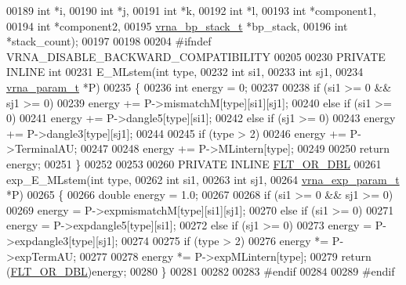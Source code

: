 \begin{DoxyCode}
00189                       \textcolor{keywordtype}{int}                   *i,
00190                       \textcolor{keywordtype}{int}                   *j,
00191                       \textcolor{keywordtype}{int}                   *k,
00192                       \textcolor{keywordtype}{int}                   *l,
00193                       \textcolor{keywordtype}{int}                   *component1,
00194                       \textcolor{keywordtype}{int}                   *component2,
00195                       \hyperlink{group__data__structures_structvrna__bp__stack__s}{vrna\_bp\_stack\_t}       *bp\_stack,
00196                       \textcolor{keywordtype}{int}                   *stack\_count);
00197 
00198 
00204 \textcolor{preprocessor}{#ifndef VRNA\_DISABLE\_BACKWARD\_COMPATIBILITY}
00205 
00230 PRIVATE INLINE \textcolor{keywordtype}{int}
00231 E\_MLstem(\textcolor{keywordtype}{int}          type,
00232          \textcolor{keywordtype}{int}          si1,
00233          \textcolor{keywordtype}{int}          sj1,
00234          \hyperlink{group__energy__parameters_structvrna__param__s}{vrna\_param\_t} *P)
00235 \{
00236   \textcolor{keywordtype}{int} energy = 0;
00237 
00238   \textcolor{keywordflow}{if} (si1 >= 0 && sj1 >= 0)
00239     energy += P->mismatchM[type][si1][sj1];
00240   \textcolor{keywordflow}{else} \textcolor{keywordflow}{if} (si1 >= 0)
00241     energy += P->dangle5[type][si1];
00242   \textcolor{keywordflow}{else} \textcolor{keywordflow}{if} (sj1 >= 0)
00243     energy += P->dangle3[type][sj1];
00244 
00245   \textcolor{keywordflow}{if} (type > 2)
00246     energy += P->TerminalAU;
00247 
00248   energy += P->MLintern[type];
00249 
00250   \textcolor{keywordflow}{return} energy;
00251 \}
00252 
00253 
00260 PRIVATE INLINE \hyperlink{group__data__structures_ga31125aeace516926bf7f251f759b6126}{FLT\_OR\_DBL}
00261 exp\_E\_MLstem(\textcolor{keywordtype}{int}              type,
00262              \textcolor{keywordtype}{int}              si1,
00263              \textcolor{keywordtype}{int}              sj1,
00264              \hyperlink{group__energy__parameters_structvrna__exp__param__s}{vrna\_exp\_param\_t} *P)
00265 \{
00266   \textcolor{keywordtype}{double} energy = 1.0;
00267 
00268   \textcolor{keywordflow}{if} (si1 >= 0 && sj1 >= 0)
00269     energy = P->expmismatchM[type][si1][sj1];
00270   \textcolor{keywordflow}{else} \textcolor{keywordflow}{if} (si1 >= 0)
00271     energy = P->expdangle5[type][si1];
00272   \textcolor{keywordflow}{else} \textcolor{keywordflow}{if} (sj1 >= 0)
00273     energy = P->expdangle3[type][sj1];
00274 
00275   \textcolor{keywordflow}{if} (type > 2)
00276     energy *= P->expTermAU;
00277 
00278   energy *= P->expMLintern[type];
00279   \textcolor{keywordflow}{return} (\hyperlink{group__data__structures_ga31125aeace516926bf7f251f759b6126}{FLT\_OR\_DBL})energy;
00280 \}
00281 
00282 
00283 \textcolor{preprocessor}{#endif}
00284 
00289 \textcolor{preprocessor}{#endif}
\end{DoxyCode}
